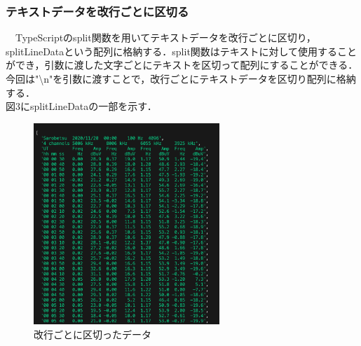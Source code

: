 \subsubsection{テキストデータを改行ごとに区切る}
　TypeScriptのsplit関数を用いてテキストデータを改行ごとに区切り，splitLineDataという配列に格納する．split関数はテキストに対して使用することができ，引数に渡した文字ごとにテキストを区切って配列にすることができる．今回は"\textbackslash n"を引数に渡すことで，改行ごとにテキストデータを区切り配列に格納する．\\
 図3にsplitLineDataの一部を示す．\\
 \begin{figure}[h]
   \centering
   \label{fig:my_label}
   \includegraphics[width=70mm]{fig/splitLineData.png}
    \caption{改行ごとに区切ったデータ}
 \end{figure}
 
